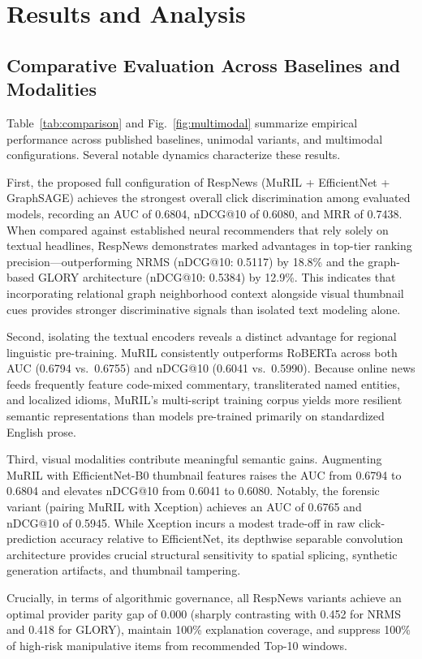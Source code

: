 \documentclass[conference]{IEEEtran}
\begin{document}
\section{Results and Analysis}
\subsection{Comparative Evaluation Across Baselines and Modalities}
Table~\ref{tab:comparison} and Fig.~\ref{fig:multimodal} summarize empirical performance across published baselines, unimodal variants, and multimodal configurations. Several notable dynamics characterize these results.

First, the proposed full configuration of RespNews (MuRIL + EfficientNet + GraphSAGE) achieves the strongest overall click discrimination among evaluated models, recording an AUC of 0.6804, nDCG@10 of 0.6080, and MRR of 0.7438. When compared against established neural recommenders that rely solely on textual headlines, RespNews demonstrates marked advantages in top-tier ranking precision—outperforming NRMS (nDCG@10: 0.5117) by 18.8\% and the graph-based GLORY architecture (nDCG@10: 0.5384) by 12.9\%. This indicates that incorporating relational graph neighborhood context alongside visual thumbnail cues provides stronger discriminative signals than isolated text modeling alone.

Second, isolating the textual encoders reveals a distinct advantage for regional linguistic pre-training. MuRIL consistently outperforms RoBERTa across both AUC (0.6794 vs.\ 0.6755) and nDCG@10 (0.6041 vs.\ 0.5990). Because online news feeds frequently feature code-mixed commentary, transliterated named entities, and localized idioms, MuRIL's multi-script training corpus yields more resilient semantic representations than models pre-trained primarily on standardized English prose.

Third, visual modalities contribute meaningful semantic gains. Augmenting MuRIL with EfficientNet-B0 thumbnail features raises the AUC from 0.6794 to 0.6804 and elevates nDCG@10 from 0.6041 to 0.6080. Notably, the forensic variant (pairing MuRIL with Xception) achieves an AUC of 0.6765 and nDCG@10 of 0.5945. While Xception incurs a modest trade-off in raw click-prediction accuracy relative to EfficientNet, its depthwise separable convolution architecture provides crucial structural sensitivity to spatial splicing, synthetic generation artifacts, and thumbnail tampering.

Crucially, in terms of algorithmic governance, all RespNews variants achieve an optimal provider parity gap of 0.000 (sharply contrasting with 0.452 for NRMS and 0.418 for GLORY), maintain 100\% explanation coverage, and suppress 100\% of high-risk manipulative items from recommended Top-10 windows.
\end{document}
